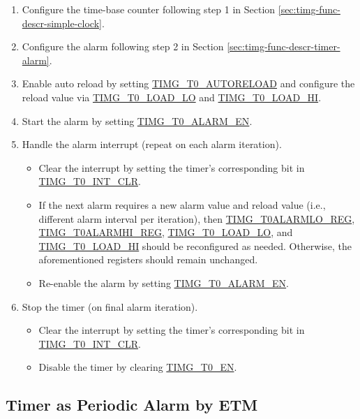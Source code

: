 \documentclass[main\_\_EN.tex]{subfiles}
\begin{document}
\begin{enumerate}
    \item Configure the time-base counter following step 1 in Section \ref{sec:timg-func-descr-simple-clock}.
    \item Configure the alarm following step 2 in Section \ref{sec:timg-func-descr-timer-alarm}.
    \item Enable auto reload by setting \hyperref[fielddesc:TIMGTXAUTORELOAD]{TIMG\_T0\_AUTORELOAD} and configure the reload value via \hyperref[fielddesc:TIMGTXLOADLO]{TIMG\_T0\_LOAD\_LO} and \hyperref[fielddesc:TIMGTXLOADHI]{TIMG\_T0\_LOAD\_HI}.
    \item Start the alarm by setting \hyperref[fielddesc:TIMGTXALARMEN]{TIMG\_T0\_ALARM\_EN}.
    \item Handle the alarm interrupt (repeat on each alarm iteration).
    \begin{itemize}
        \item Clear the interrupt by setting the timer's corresponding bit in \hyperref[fielddesc:TIMGT0INTCLR]{TIMG\_T0\_INT\_CLR}.
        \item If the next alarm requires a new alarm value and reload value (i.e., different alarm interval per iteration), then \hyperref[regdesc:TIMGTXALARMLOREG]{TIMG\_T0ALARMLO\_REG}, \hyperref[regdesc:TIMGTXALARMHIREG]{TIMG\_T0ALARMHI\_REG}, \hyperref[fielddesc:TIMGTXLOADLO]{TIMG\_T0\_LOAD\_LO}, and \hyperref[fielddesc:TIMGTXLOADHI]{TIMG\_T0\_LOAD\_HI} should be reconfigured as needed. Otherwise, the aforementioned registers should remain unchanged.
        \item Re-enable the alarm by setting \hyperref[fielddesc:TIMGTXALARMEN]{TIMG\_T0\_ALARM\_EN}.
    \end{itemize}
    \item Stop the timer (on final alarm iteration).
    \begin{itemize}
        \item Clear the interrupt by setting the timer's corresponding bit in \hyperref[fielddesc:TIMGT0INTCLR]{TIMG\_T0\_INT\_CLR}.
        \item Disable the timer by clearing \hyperref[fielddesc:TIMGTXEN]{TIMG\_T0\_EN}.
    \end{itemize}
\end{enumerate}

\subsection{Timer as Periodic Alarm by ETM} \label{sec:timg-conf-etm}
\end{document}
